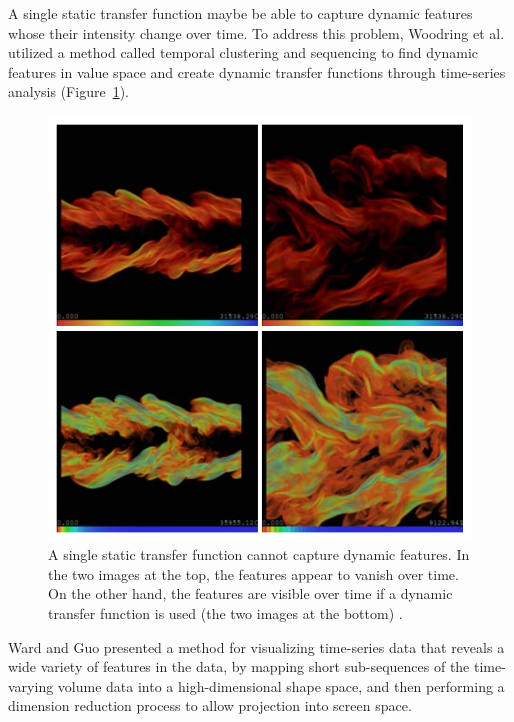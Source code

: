 A single static transfer function maybe be able to capture dynamic features whose their intensity change over time.
To address this problem, Woodring et al. \cite{woodring_semi-automatic_2009} utilized a method called temporal clustering and sequencing to find dynamic features in value space and create dynamic transfer functions through time-series analysis (Figure~\ref{fig:woodring_semi-automatic_2009}).

\begin{figure}
	\centering
	\includegraphics[width=1\linewidth]{images/woodring_semi-automatic_2009}
	\caption{A single static transfer function cannot capture dynamic features. In the two images at the top, the features appear to vanish over time. On the other hand, the features are visible over time if a dynamic transfer function is used (the two images at the bottom) \cite{woodring_semi-automatic_2009}.}
	\label{fig:woodring_semi-automatic_2009}
\end{figure}

Ward and Guo \cite{ward_visual_2011} presented a method for visualizing time-series data that reveals a wide variety of features in the data, by mapping short sub-sequences of the time-varying volume data into a high-dimensional shape space, and then performing a dimension reduction process to allow projection into screen space.


